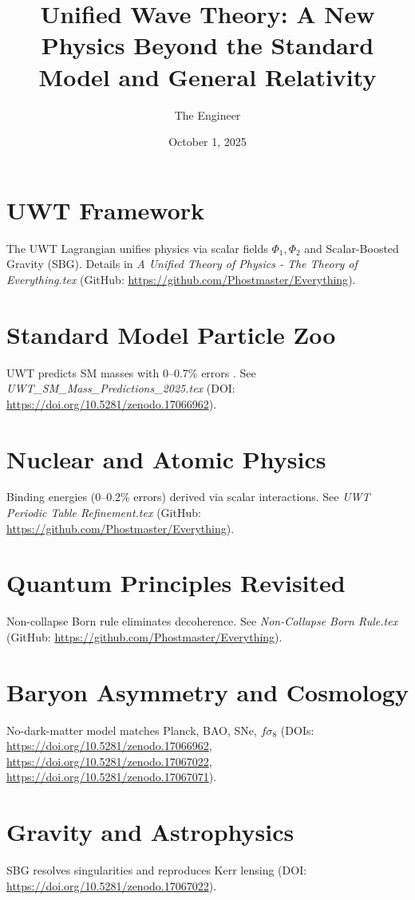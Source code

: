 \documentclass{article}
\title{Unified Wave Theory: A New Physics Beyond the Standard Model and General Relativity}
\author{The Engineer}
\date{October 1, 2025}
\begin{document}
\maketitle

\section{UWT Framework}
The UWT Lagrangian unifies physics via scalar fields \(\Phi_1, \Phi_2\) and Scalar-Boosted Gravity (SBG). Details in \textit{A Unified Theory of Physics - The Theory of Everything.tex} (GitHub: \url{https://github.com/Phostmaster/Everything}).
\section{Standard Model Particle Zoo}
UWT predicts SM masses with 0--0.7\% errors \citep{Baldwin2025Masses}. See \textit{UWT\_SM\_Mass\_Predictions\_2025.tex} (DOI: \url{https://doi.org/10.5281/zenodo.17066962}).
\section{Nuclear and Atomic Physics}
Binding energies (0--0.2\% errors) derived via scalar interactions. See \textit{UWT Periodic Table Refinement.tex} (GitHub: \url{https://github.com/Phostmaster/Everything}).
\section{Quantum Principles Revisited}
Non-collapse Born rule eliminates decoherence. See \textit{Non-Collapse Born Rule.tex} (GitHub: \url{https://github.com/Phostmaster/Everything}).
\section{Baryon Asymmetry and Cosmology}
No-dark-matter model matches Planck, BAO, SNe, \(f\sigma_8\) \citep{Baldwin2025Cosmo,Baldwin2025Bullet,Baldwin2025Baryo} (DOIs: \url{https://doi.org/10.5281/zenodo.17066962}, \url{https://doi.org/10.5281/zenodo.17067022}, \url{https://doi.org/10.5281/zenodo.17067071}).
\section{Gravity and Astrophysics}
SBG resolves singularities and reproduces Kerr lensing \citep{Baldwin2025BlackHoles} (DOI: \url{https://doi.org/10.5281/zenodo.17067022}).
\end{document}
